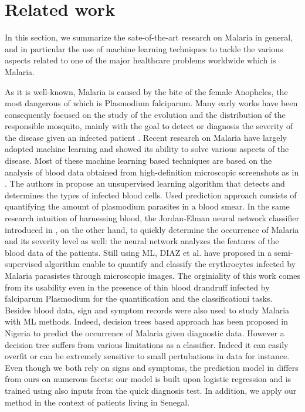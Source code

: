 \section{Related work}\label{related_work}
In this section, we summarize the sate-of-the-art research on Malaria in general, and in particular the
use of machine learning techniques to tackle the various aspects related to one of the 
major healthcare problems worldwide which is Malaria.

As it is well-known, Malaria is caused by the bite of the female Anopheles, the most dangerous of which
is Plasmodium falciparum. Many early works have been consequently focused on the study of the evolution and
the distribution of the responsible mosquito, mainly with the goal to detect or diagnosis the severity of the 
disease given an infected patient \cite{Fe03,Al09}. Recent research on Malaria have largely adopted machine learning
and showed its ability to solve various aspects of the disease. Most of these machine learning based techniques are 
based on the analysis of blood data obtained from high-definition microscopic screenshots as in \cite{Ku18}. The authors
in \cite{Ku18} propose an unsupervised learning algorithm that detects and determines the types of infected blood cells.
Used prediction approach consists of quantifying the amount of plasmodium parasites in a blood smear. In the same research intuition
of harnessing blood, the Jordan-Elman neural network classifier introduced in \cite{Ha15}, on the other hand, to quickly determine the occurrence 
of Malaria and its severity level as well: the neural network analyzes the features of the blood data of the patients.  
Still using ML, DIAZ et al. have proposed in \cite{Dia09} a semi-supervised algorithm enable to quantify and classify the 
erythrocytes infected by Malaria parasistes through microscopic images. The orginiality of this work comes from its usability
even in the presence of thin blood drandruff infected by falciparum Plasmodium for the quantification and the classificationi tasks.
Besides blood data, sign and symptom records were also used to study Malaria with ML methods. Indeed, decision trees based approach
has been proposed in Nigeria \cite{Ug10} to predict the occurrence of Malaria given diagnostic data. However a decision tree suffers 
from various limitations as a classifier. Indeed it can easily overfit or can be extremely sensitive to small pertubations in data for instance.
Even though we both rely on signs and symptoms, the prediction model in \cite{Ug10} differs from ours on numerous facets: our model is built upon
logistic regression and is trained using also inputs from the quick diagnosis test. In addition, we apply our method in the context of patients living in Senegal. 

